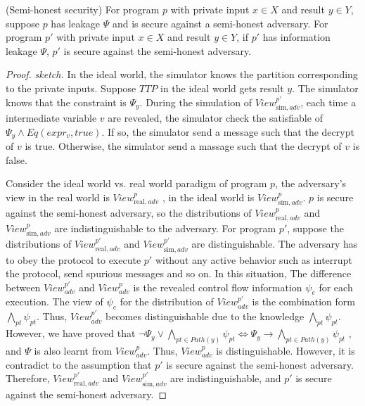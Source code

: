 \begin{theorem}(Semi-honest security)
    For program $p$ with private input $x\in X$ and result $y\in Y$, suppose $p$ has leakage $\Psi$ and is secure against a semi-honest adversary.
    For program $p'$ with private input $x\in X$ and result $y\in Y$, if $p'$ has information leakage $\Psi$, $p'$ is secure against the semi-honest adversary.
\end{theorem}
\begin{proof}
\textit{sketch.}
In the ideal world, the simulator knows the partition corresponding to the private inputs.
Suppose $TTP$ in the ideal world gets result $y$. The simulator knows that the constraint is $\Psi_y$.
During the simulation of $View_{\text{sim},adv}^{p'}$, each time a intermediate variable $v$ are revealed, the simulator check the satisfiable of $\Psi_y\land Eq(expr_v, true)$.
If so, the simulator send a message such that the decrypt of $v$ is true. Otherwise, the simulator send a massage such that the decrypt of $v$ is false.


Consider the ideal world vs. real world paradigm of program $p$, the adversary's view in the real world is $View_{\text{real},adv}^{p}$ , in the ideal world is $View_{\text{sim},adv}^{p}$. $p$ is secure against the semi-honest adversary, so the distributions of $View_{\text{real},adv}^{p}$  and $View_{\text{sim},adv}^{p}$ are indistinguishable to the adversary. For program $p'$, suppose the distributions of $View_{\text{real},adv}^{p'}$  and $View_{\text{sim},adv}^{p'}$  are distinguishable. The adversary has to obey the protocol to execute $p'$ without any active behavior such as interrupt the protocol, send spurious messages and so on. In this situation, The difference between $View_{adv}^{p'}$ and $View_{adv}^{p}$ is the revealed control flow information $\psi_e$ for each execution. The view of $\psi_e$ for the distribution of $View_{adv}^{p'}$ is the combination form $\bigwedge_{pt}\psi_{pt}$. Thus, $View_{adv}^{p'}$ becomes distinguishable due to the knowledge $\bigwedge_{pt}\psi_{pt}$. However, we have proved that $ \neg \Psi_y \lor \bigwedge_{pt\in Path(y)} \psi_{pt}\Leftrightarrow\Psi_y\rightarrow \bigwedge_{pt\in Path(y)}\psi_{pt}$ , and $\Psi$ is also learnt from $View_{adv}^{p}$. Thus, $View_{adv}^{p}$ is distinguishable. However, it is contradict to the assumption that $p'$ is secure against the semi-honest adversary. Therefore, $View_{\text{real},adv}^{p'}$ and $View_{\text{sim},adv}^{p'}$ are indistinguishable, and $p'$ is secure against the semi-honest adversary.
\end{proof}
